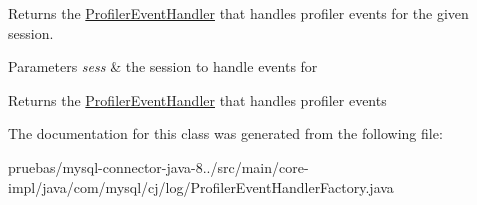 Returns the \mbox{\hyperlink{interfacecom_1_1mysql_1_1cj_1_1log_1_1_profiler_event_handler}{Profiler\+Event\+Handler}} that handles profiler events for the given session.


\begin{DoxyParams}{Parameters}
{\em sess} & the session to handle events for \\
\hline
\end{DoxyParams}
\begin{DoxyReturn}{Returns}
the \mbox{\hyperlink{interfacecom_1_1mysql_1_1cj_1_1log_1_1_profiler_event_handler}{Profiler\+Event\+Handler}} that handles profiler events 
\end{DoxyReturn}


The documentation for this class was generated from the following file\+:\begin{DoxyCompactItemize}
\item 
pruebas/mysql-\/connector-\/java-\/8../src/main/core-\/impl/java/com/mysql/cj/log/Profiler\+Event\+Handler\+Factory.\+java\end{DoxyCompactItemize}
